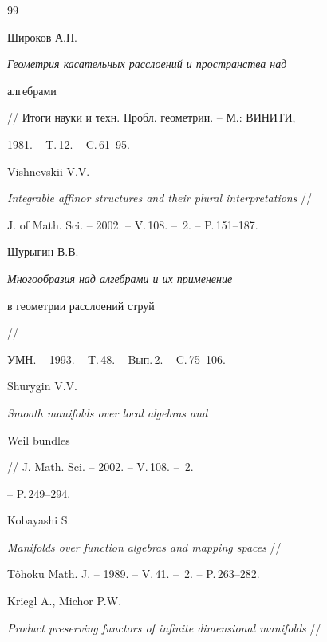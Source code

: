 \begin{thebibliography}{99}







Широков А.П.


{\it Геометрия касательных расслоений и пространства над


алгебрами} // Итоги науки и техн. Пробл. геометрии. -- М.: ВИНИТИ,


1981. -- T.\,12. -- C.\,61--95.







Vishnevskii V.V.


{\it Integrable affinor structures and their plural interpretations} //


J. of Math. Sci. -- 2002. -- V.\,108. -- \No\,2. -- P.\,151--187.







Шурыгин В.В.


{\it Многообразия над алгебрами и их применение


в геометрии расслоений струй} //


УМН. -- 1993. -- T.\,48. -- Bып.\,2. -- C.\,75--106.







Shurygin V.V.


{\it Smooth manifolds over local algebras and


Weil bundles} // J. Math. Sci. -- 2002. -- V.\,108. -- \No\,2.


-- P.\,249--294.







Kobayashi S.


{\it Manifolds over function algebras and mapping spaces} //


T\^ohoku Math. J. -- 1989. -- V.\,41. -- \No\,2. -- P.\,263--282.







Kriegl A., Michor P.W.


{\it Product preserving functors of infinite dimensional manifolds} //



\end{thebibliography}
